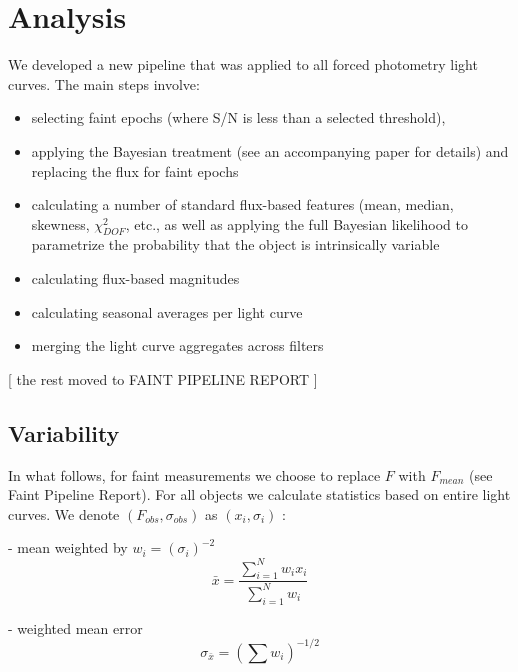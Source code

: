 \documentclass[fleqn,usenatbib]{mnras}  %
\begin{document}
\section{Analysis}
\label{sec:analysis}
We developed  a new pipeline that was applied to all forced photometry light curves.  The main steps involve:
\begin{itemize}
  \item selecting faint epochs (where S/N  is less than a selected threshold), 
  \item applying the Bayesian treatment (see an accompanying paper for details) and replacing the flux for faint epochs 
  \item calculating a number of  standard flux-based features (mean, median, skewness, $\chi^{2}_{DOF}$, etc., as well as  applying the full Bayesian likelihood to parametrize the probability that the object is intrinsically variable
  \item calculating flux-based magnitudes
  \item calculating seasonal averages per light curve 
  \item merging the light curve aggregates across filters
\end{itemize}

[ the rest  moved to FAINT PIPELINE REPORT  ] 

\subsection{Variability}


%
%

%
%

In what follows, for faint measurements we choose to replace $F$ with $F_{mean}$  (see Faint Pipeline Report). For all objects we calculate statistics based on entire light curves. We denote $(F_{obs}, \sigma_{obs})$ as $(x_{i},\sigma_{i})$ : 

- mean weighted by  $w_{i} = (\sigma_{i})^{-2}$
\begin{equation}
\bar{x} = \frac{\sum_{i=1}^{N}{w_{i}x_{i}}}{\sum_{i=1}^{N}{w_{i}}}
\end{equation}

- weighted mean error 
\begin{equation}
\sigma_{\bar{x}} = \left( \sum{w_{i}}\right) ^{-1/2} 
\end{equation}
\end{document}
